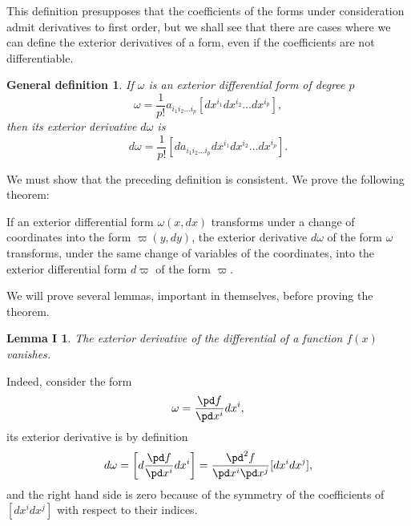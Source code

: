 This definition presupposes that the coefficients of the forms under consideration admit derivatives to first order, but we shall see that there are cases where we can define the exterior derivatives of a form, even if the coefficients are not differentiable.

\theoremstyle{shape1}
\newtheorem*{gdef*}{\hspace{15pt}General definition}

\begin{gdef*}
  If $\omega$ is an exterior differential form of degree $p$
  \begin{equation}
    \label{eq:2.1}
    \omega=\frac{1}{p!}a_{i_{1}i_{2}\dots i_{p}}[dx^{i_{1}}dx^{i_{2}}\dots dx^{i_{p}}],
  \end{equation}
then its exterior derivative $d\omega$ is
\begin{equation}
  \label{eq:2.2}
    d\omega=\frac{1}{p!}[da_{i_{1}i_{2}\dots i_{p}}dx^{i_{1}}dx^{i_{2}}\dots dx^{i_{p}}].
\end{equation}
\end{gdef*}

\vspace{12pt}\fsec We must show that the preceding definition is consistent. We  prove the following theorem:

\begin{thm*}
  If an exterior differential form $\omega(x,dx)$ transforms under a change of coordinates into the form $\varpi(y,dy)$, the exterior derivative $d\omega$ of the form $\omega$ transforms, under the same change of variables of the coordinates, into the exterior differential form $d\varpi$ of the form $\varpi$.
\end{thm*}

We will prove several lemmas, important in themselves, before proving the theorem.

\newtheorem*{lem1*}{\hspace{15pt}Lemma I}

\begin{lem1*}
  The exterior derivative of the differential of a function $f(x)$ vanishes.
\end{lem1*}
Indeed, consider the form
\[
\omega=\frac{\pd f}{\pd x^{i}}dx^{i},
\]
its exterior derivative is by definition
\[
d\omega=\left[d\frac{\pd f}{\pd x^{i}}dx^{i}\right]=\frac{\pd^{2} f}{\pd x^{i}\pd x^{j}}[dx^{i}dx^{j}],
\]
and the right hand side is zero because of the symmetry of the coefficients of $[dx^{i}dx^{j}]$ with respect to their indices.

